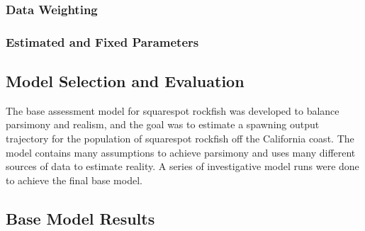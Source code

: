 \documentclass[11pt,
  english,
  a4paper,
]{article}
\begin{document}
\leavevmode\tagmcend\tagstructend\par


\hypertarget{data-weighting}{%
\subsubsection{Data Weighting}\label{data-weighting}}

\leavevmode\tagmcend\tagstructend


\hypertarget{estimated-and-fixed-parameters}{%
\subsubsection{Estimated and Fixed Parameters}\label{estimated-and-fixed-parameters}}

\leavevmode\tagmcend\tagstructend


\hypertarget{model-selection-and-evaluation}{%
\subsection{Model Selection and Evaluation}\label{model-selection-and-evaluation}}

\leavevmode\tagmcend\tagstructend


The base assessment model for squarespot rockfish was developed to balance parsimony and realism, and the goal was to estimate a spawning output trajectory for the population of squarespot rockfish off the California coast. The model contains many assumptions to achieve parsimony and uses many different sources of data to estimate reality. A series of investigative model runs were done to achieve the final base model.

\leavevmode\tagmcend\tagstructend\par


\hypertarget{base-model-results}{%
\subsection{Base Model Results}\label{base-model-results}}

\leavevmode\tagmcend\tagstructend
\end{document}
